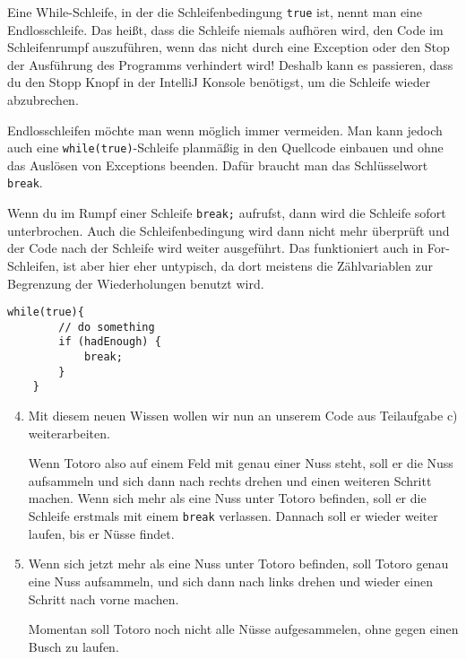 \begin{Infobox}
	Eine While-Schleife, in der die Schleifenbedingung \lstinline{true} ist, nennt man eine Endlosschleife.
	Das heißt, dass die Schleife niemals aufhören wird, den Code im Schleifenrumpf auszuführen, wenn das nicht durch eine Exception oder den Stop der Ausführung des Programms verhindert wird!
	Deshalb kann es passieren, dass du den Stopp Knopf in der IntelliJ Konsole benötigst, um die Schleife wieder abzubrechen.\newline

	Endlosschleifen möchte man wenn  möglich immer vermeiden.
	Man kann jedoch auch eine \lstinline{while(true)}-Schleife planmäßig in den Quellcode einbauen und ohne das Auslösen von Exceptions beenden.
	Dafür braucht man das Schlüsselwort \lstinline{break}.\newline

	Wenn du im Rumpf einer Schleife \lstinline{break;} aufrufst, dann wird die Schleife sofort unterbrochen.
	Auch die Schleifenbedingung wird dann nicht mehr überprüft und der Code nach der Schleife wird weiter ausgeführt.
	Das funktioniert auch in For-Schleifen, ist aber hier eher untypisch, da  dort meistens die Zählvariablen zur Begrenzung der Wiederholungen benutzt wird.

	\begin{lstlisting}[numbers=none]
	while(true){
		// do something
		if (hadEnough) {
			break;
		}
	}
	\end{lstlisting}

\end{Infobox}


\begin{enumerate}\setcounter{enumi}{3}
	\item
	Mit diesem neuen Wissen wollen wir nun an unserem Code aus Teilaufgabe c) weiterarbeiten.

	Wenn Totoro also auf einem Feld mit genau einer Nuss steht, soll er die Nuss aufsammeln und 
	sich dann nach rechts drehen und einen weiteren Schritt machen.
	Wenn sich mehr als eine Nuss unter Totoro befinden, soll er die Schleife erstmals mit einem \lstinline{break} verlassen.
	Dannach soll er wieder weiter laufen, bis er Nüsse findet.	
	\item
	Wenn sich jetzt mehr als eine Nuss unter Totoro befinden, 
	soll Totoro genau eine Nuss aufsammeln, und sich dann nach links drehen und  wieder einen Schritt nach vorne machen.
	
	Momentan soll Totoro noch nicht alle Nüsse aufgesammelen, ohne gegen einen Busch zu laufen.
	\end{enumerate}
	
